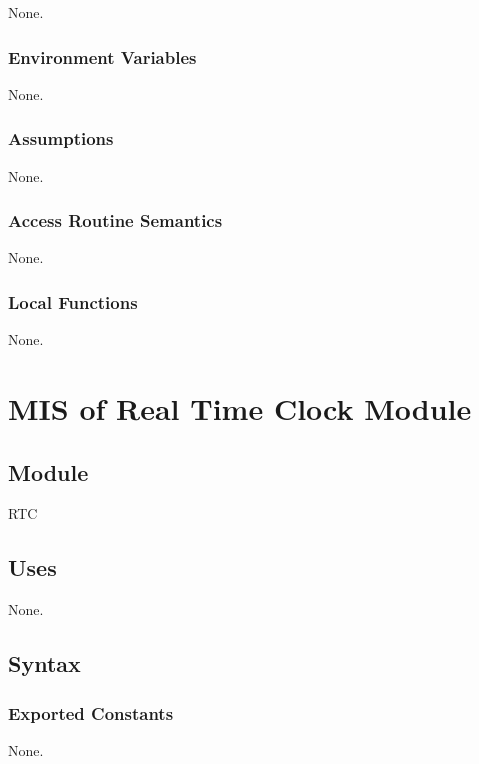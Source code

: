 \documentclass[12pt, titlepage]{article}
\begin{document}
None.

\subsubsection{Environment Variables}

None.

\subsubsection{Assumptions}

None.

\subsubsection{Access Routine Semantics}

None.

\subsubsection{Local Functions}

None.

\newpage




\section{MIS of Real Time Clock Module} \label{mRTC} 

\subsection{Module}

RTC

\subsection{Uses}

None.

\subsection{Syntax}

\subsubsection{Exported Constants}

None.
\end{document}
